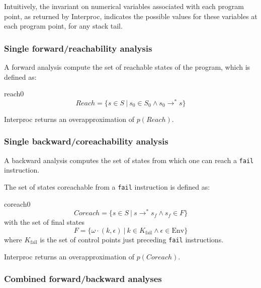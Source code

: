 \documentclass[a4paper,11pt]{article}
\begin{document}
Intuitively, the invariant on numerical variables associated with
each program point, as returned by Interproc, indicates the
possible values for these variables at each program point, for any
stack tail.

\subsubsection*{Single forward/reachability analysis}

A forward analysis compute the set of reachable states of the program, which is defined as:
\htmlonly{\begin{quote}}\begin{image}{reach0}
  $$
Reach = \{ s\in S ~|~ s_0\in S_0 \wedge s_0\rightarrow^* s \}
  $$
\end{image}\htmlonly{\end{quote}}
Interproc returns an overapproximation of $p(Reach)$.

\subsubsection*{Single backward/coreachability analysis}

A backward analysis computes the set of states from which one
can reach a \texttt{fail} instruction.

The set of states coreachable from a \texttt{fail} instruction is
defined as: 
\htmlonly{\begin{quote}}\begin{image}{coreach0}
$$
Coreach = \{ s\in S ~|~ s\rightarrow^* s_f \wedge s_f\in F \}
$$
with the set of final states 
$$
F = \{ \omega\cdot (k,\epsilon) ~|~ k\in K_\mathrm{fail} \wedge \epsilon\in\mathrm{Env} \}
$$
where $K_\mathrm{fail}$ is the set of control points just
preceding \texttt{fail} instructions.
\end{image}\htmlonly{\end{quote}}
Interproc returns an overapproximation of $p(Coreach)$.

\subsubsection*{Combined forward/backward analyses}
\end{document}
